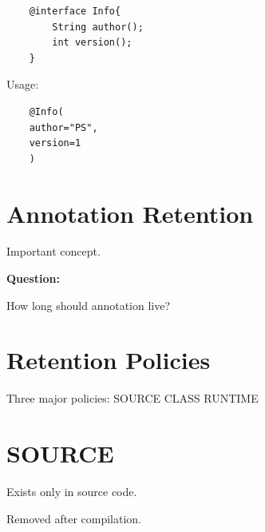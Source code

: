 \documentclass[11pt,a4paper]{book}
\begin{document}
\begin{verbatim} 
    @interface Info{
        String author();
        int version();
    }
\end{verbatim}


Usage:

\begin{verbatim} 
    @Info(
    author="PS",
    version=1
    )
\end{verbatim}


\section{Annotation Retention}

Important concept.


\textbf{Question:}


How long should annotation live?


\section{Retention Policies}

Three major policies:
SOURCE
CLASS
RUNTIME


\section{SOURCE}

Exists only in source code.


Removed after compilation.

\end{document}
